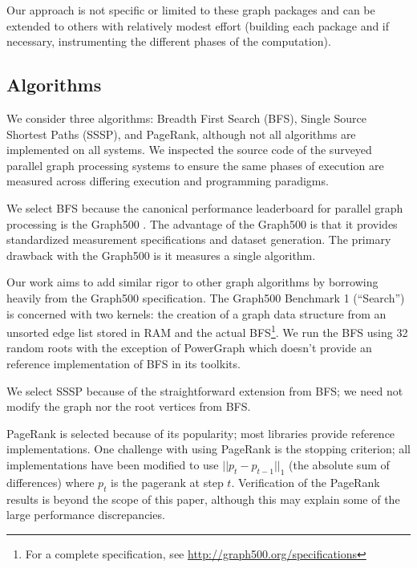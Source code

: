 \documentclass[conference]{IEEEtran}
\begin{document}
Our approach is not specific or limited to these graph packages and can be extended to others with relatively modest effort (building each package and if necessary, instrumenting the different phases of the computation).

\subsection{Algorithms}\label{sec:algs}

We consider three algorithms: Breadth First Search (BFS), Single Source Shortest Paths (SSSP), and PageRank, although not all algorithms are implemented on all systems. We inspected the source code of the surveyed parallel graph processing systems to ensure the same phases of execution are measured across differing execution and programming paradigms. 

We select BFS because the canonical performance leaderboard for parallel graph processing is the Graph500 \cite{Murphy:2010:Graph500}. The advantage of the Graph500 is that it provides standardized measurement specifications and dataset generation. The primary drawback with the Graph500 is it measures a single algorithm.

Our work aims to add similar rigor to other graph algorithms by borrowing heavily from the Graph500 specification. The Graph500 Benchmark 1 (``Search'') is concerned with two kernels: the creation of a graph data structure from an unsorted edge list stored in RAM and the actual BFS\footnote{For a complete specification, see \url{http://graph500.org/specifications}}. We run the BFS using 32 random roots with the exception of PowerGraph which doesn't provide an reference implementation of BFS in its toolkits.

We select SSSP because of the straightforward extension from BFS; we need not modify the graph nor the root vertices from BFS.

PageRank is selected because of its popularity; most libraries provide reference implementations. One challenge with using PageRank is the stopping criterion; all implementations have been modified to use $|| p_t - p_{t-1}||_1$ (the absolute sum of differences) where $p_t$ is the pagerank at step $t$. Verification of the PageRank results is beyond the scope of this paper, although this may explain some of the large performance discrepancies.
\end{document}

